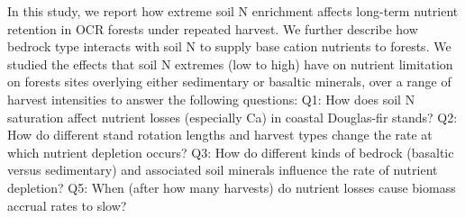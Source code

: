 In this study, we report how extreme soil N enrichment affects long-term nutrient retention in OCR forests under repeated harvest. We further describe how bedrock type interacts with soil N to supply base cation nutrients to forests. We studied the effects that soil N extremes (low to high) have on nutrient limitation on forests sites overlying either sedimentary or basaltic minerals, over a range of harvest intensities to answer the following questions: Q1: How does soil N saturation affect nutrient losses (especially Ca) in coastal Douglas-fir stands? Q2: How do different stand rotation lengths and harvest types change the rate at which nutrient depletion occurs? Q3: How do different kinds of bedrock (basaltic versus sedimentary) and associated soil minerals influence the rate of nutrient depletion? Q5: When (after how many harvests) do nutrient losses cause biomass accrual rates to slow?